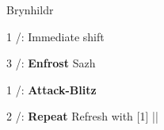 \begin{mainlist}
	\item \skip
\end{mainlist}
\begin{fight}{Brynhildr}
	\item [1] \com/\rav: Immediate shift
	\item [3] \syn/\sab: \textbf{Enfrost} Sazh
	\item [1] \com/\rav: \textbf{Attack-Blitz}
	\item [2] \com/\med: \textbf{Repeat} \to Refresh with [1] ||\save
\end{fight}
